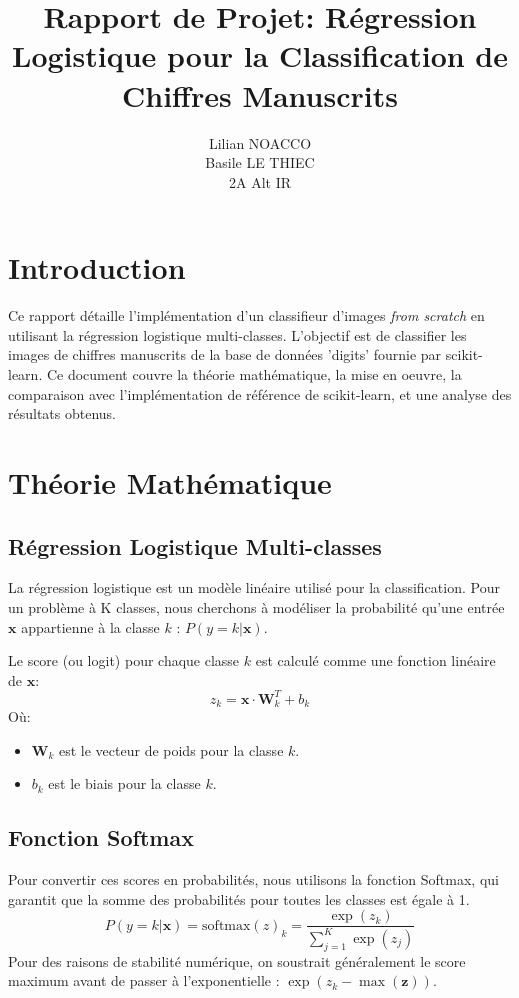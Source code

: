 \documentclass{article}
\title{Rapport de Projet: Régression Logistique pour la Classification de Chiffres Manuscrits}
\author{Lilian NOACCO \\ Basile LE THIEC \\ 2A Alt IR}
\date{}
\begin{document}
\maketitle

\section{Introduction}

Ce rapport détaille l'implémentation d'un classifieur d'images \textit{from
    scratch} en utilisant la régression logistique multi-classes. L'objectif est de
classifier les images de chiffres manuscrits de la base de données 'digits'
fournie par scikit-learn. Ce document couvre la théorie mathématique, la mise
en oeuvre, la comparaison avec l'implémentation de référence de scikit-learn,
et une analyse des résultats obtenus.

\section{Théorie Mathématique}

\subsection{Régression Logistique Multi-classes}

La régression logistique est un modèle linéaire utilisé pour la classification.
Pour un problème à K classes, nous cherchons à modéliser la probabilité qu'une
entrée $\mathbf{x}$ appartienne à la classe $k$ : $P(y=k | \mathbf{x})$.

Le score (ou logit) pour chaque classe $k$ est calculé comme une fonction
linéaire de $\mathbf{x}$:
\begin{equation}
    z_k = \mathbf{x} \cdot \mathbf{W}_k^T + b_k
\end{equation}
Où:
\begin{itemize}
    \item $\mathbf{W}_k$ est le vecteur de poids pour la classe $k$.
    \item $b_k$ est le biais pour la classe $k$.
\end{itemize}

\subsection{Fonction Softmax}

Pour convertir ces scores en probabilités, nous utilisons la fonction Softmax,
qui garantit que la somme des probabilités pour toutes les classes est égale à
1.
\begin{equation}
    P(y=k | \mathbf{x}) = \text{softmax}(z)_k = \frac{\exp(z_k)}{\sum_{j=1}^{K} \exp(z_j)}
\end{equation}
Pour des raisons de stabilité numérique, on soustrait généralement le score maximum avant de passer à l'exponentielle : $\exp(z_k - \max(\mathbf{z}))$.
\end{document}
